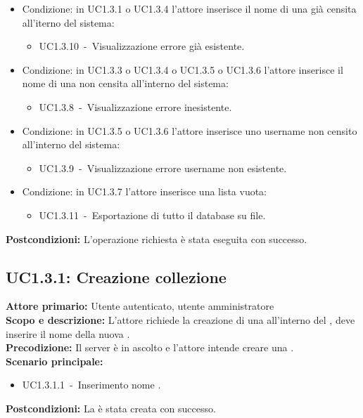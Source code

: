 \documentclass{scalatekids-article}
\begin{document}
\begin{itemize}
\item Condizione: in UC1.3.1 o UC1.3.4 l'attore inserisce il nome di una  già censita all'iterno del sistema:
  \begin{itemize}
  \item UC1.3.10\ -\ Visualizzazione errore  già esistente.
  \end{itemize}
\item Condizione: in UC1.3.3 o UC1.3.4 o UC1.3.5 o UC1.3.6 l'attore inserisce il nome di una  non censita all'interno del sistema:
  \begin{itemize}
  \item UC1.3.8\ -\ Visualizzazione errore  inesistente.
  \end{itemize}
\item Condizione: in UC1.3.5 o UC1.3.6 l'attore inserisce uno username non censito all'interno del sistema:
  \begin{itemize}
  \item UC1.3.9\ -\ Visualizzazione errore username non esistente.
  \end{itemize}
\item Condizione: in UC1.3.7 l'attore inserisce una lista  vuota:
  \begin{itemize}
  \item UC1.3.11\ -\ Esportazione di tutto il database su file.
  \end{itemize}
\end{itemize}
\textbf{Postcondizioni:} L'operazione richiesta è stata eseguita con successo.

\subsection{UC1.3.1: Creazione collezione}

\textbf{Attore primario:} Utente autenticato, utente amministratore\\
\textbf{Scopo e descrizione:} L'attore richiede la creazione di una  all'interno del , deve inserire il nome della nuova .\\
\textbf{Precodizione:} Il server è in ascolto e l'attore intende creare una .\\
\textbf{Scenario principale:}
\begin{itemize}
\item UC1.3.1.1\ -\ Inserimento nome .
\end{itemize}
\textbf{Postcondizioni:} La  è stata creata con successo.
\end{document}
